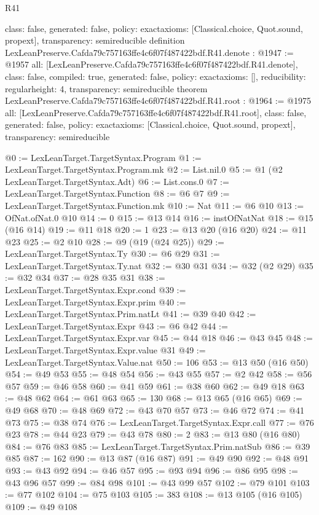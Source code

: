 \begin{lexlean}{R41}
\begin{coremodule}
{  class: false,
  generated: false,
  policy: exact{axioms: [Classical.choice, Quot.sound, propext]},
  transparency: semireducible
}
definition LexLeanPreserve.Cafda79c757163ffe4c6f07f487422bdf.R41.denote : @1947 := @1957 {
  all: [LexLeanPreserve.Cafda79c757163ffe4c6f07f487422bdf.R41.denote],
  class: false,
  compiled: true,
  generated: false,
  policy: exact{axioms: []},
  reducibility: regular{height: 4},
  transparency: semireducible
}
theorem LexLeanPreserve.Cafda79c757163ffe4c6f07f487422bdf.R41.root : @1964 := @1975 {
  all: [LexLeanPreserve.Cafda79c757163ffe4c6f07f487422bdf.R41.root],
  class: false,
  generated: false,
  policy: exact{axioms: [Classical.choice, Quot.sound, propext]},
  transparency: semireducible
}

@0 := LexLeanTarget.TargetSyntax.Program
@1 := LexLeanTarget.TargetSyntax.Program.mk
@2 := List.nil.{0}
@5 := @1 (@2 LexLeanTarget.TargetSyntax.Adt)
@6 := List.cons.{0}
@7 := LexLeanTarget.TargetSyntax.Function
@8 := @6 @7
@9 := LexLeanTarget.TargetSyntax.Function.mk
@10 := Nat
@11 := @6 @10
@13 := OfNat.ofNat.{0} @10
@14 := 0
@15 := @13 @14
@16 := instOfNatNat
@18 := @15 (@16 @14)
@19 := @11 @18
@20 := 1
@23 := @13 @20 (@16 @20)
@24 := @11 @23
@25 := @2 @10
@28 := @9 (@19 (@24 @25))
@29 := LexLeanTarget.TargetSyntax.Ty
@30 := @6 @29
@31 := LexLeanTarget.TargetSyntax.Ty.nat
@32 := @30 @31
@34 := @32 (@2 @29)
@35 := @32 @34
@37 := @28 @35 @31
@38 := LexLeanTarget.TargetSyntax.Expr.cond
@39 := LexLeanTarget.TargetSyntax.Expr.prim
@40 := LexLeanTarget.TargetSyntax.Prim.natLt
@41 := @39 @40
@42 := LexLeanTarget.TargetSyntax.Expr
@43 := @6 @42
@44 := LexLeanTarget.TargetSyntax.Expr.var
@45 := @44 @18
@46 := @43 @45
@48 := LexLeanTarget.TargetSyntax.Expr.value @31
@49 := LexLeanTarget.TargetSyntax.Value.nat
@50 := 106
@53 := @13 @50 (@16 @50)
@54 := @49 @53
@55 := @48 @54
@56 := @43 @55
@57 := @2 @42
@58 := @56 @57
@59 := @46 @58
@60 := @41 @59
@61 := @38 @60
@62 := @49 @18
@63 := @48 @62
@64 := @61 @63
@65 := 130
@68 := @13 @65 (@16 @65)
@69 := @49 @68
@70 := @48 @69
@72 := @43 @70 @57
@73 := @46 @72
@74 := @41 @73
@75 := @38 @74
@76 := LexLeanTarget.TargetSyntax.Expr.call
@77 := @76 @23
@78 := @44 @23
@79 := @43 @78
@80 := 2
@83 := @13 @80 (@16 @80)
@84 := @76 @83
@85 := LexLeanTarget.TargetSyntax.Prim.natSub
@86 := @39 @85
@87 := 162
@90 := @13 @87 (@16 @87)
@91 := @49 @90
@92 := @48 @91
@93 := @43 @92
@94 := @46 @57
@95 := @93 @94
@96 := @86 @95
@98 := @43 @96 @57
@99 := @84 @98
@101 := @43 @99 @57
@102 := @79 @101
@103 := @77 @102
@104 := @75 @103
@105 := 383
@108 := @13 @105 (@16 @105)
@109 := @49 @108

\end{coremodule}
\end{lexlean}
